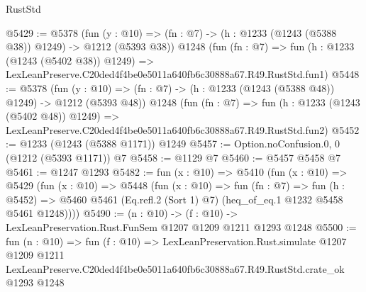 \begin{lexlean}{RustStd}
\begin{coremodule}
@5429 := @5378
    (fun (y : @10) => (fn : @7) -> (h : @1233 (@1243 (@5388 @38)) @1249) -> @1212 (@5393 @38))
    @1248
    (fun (fn : @7) =>
    fun (h : @1233 (@1243 (@5402 @38)) @1249) =>
    LexLeanPreserve.C20ded4f4be0e5011a640fb6c30888a67.R49.RustStd.fun1)
@5448 := @5378
    (fun (y : @10) => (fn : @7) -> (h : @1233 (@1243 (@5388 @48)) @1249) -> @1212 (@5393 @48))
    @1248
    (fun (fn : @7) =>
    fun (h : @1233 (@1243 (@5402 @48)) @1249) =>
    LexLeanPreserve.C20ded4f4be0e5011a640fb6c30888a67.R49.RustStd.fun2)
@5452 := @1233 (@1243 (@5388 @1171)) @1249
@5457 := Option.noConfusion.{0, 0} (@1212 (@5393 @1171)) @7
@5458 := @1129 @7
@5460 := @5457 @5458 @7
@5461 := @1247 @1293
@5482 := fun (x : @10) =>
  @5410
    (fun (x : @10) =>
    @5429
      (fun (x : @10) =>
      @5448
        (fun (x : @10) =>
        fun (fn : @7) =>
        fun (h : @5452) =>
        @5460 @5461 (Eq.refl.{2} (Sort 1) @7) (heq_of_eq.{1} @1232 @5458 @5461 @1248))))
@5490 := (n : @10) -> (f : @10) -> LexLeanPreservation.Rust.FunSem @1207 @1209 @1211 @1293 @1248
@5500 := fun (n : @10) =>
  fun (f : @10) =>
  LexLeanPreservation.Rust.simulate
    @1207
    @1209
    @1211
    LexLeanPreserve.C20ded4f4be0e5011a640fb6c30888a67.R49.RustStd.crate_ok
    @1293
    @1248
\end{coremodule}
\end{lexlean}
